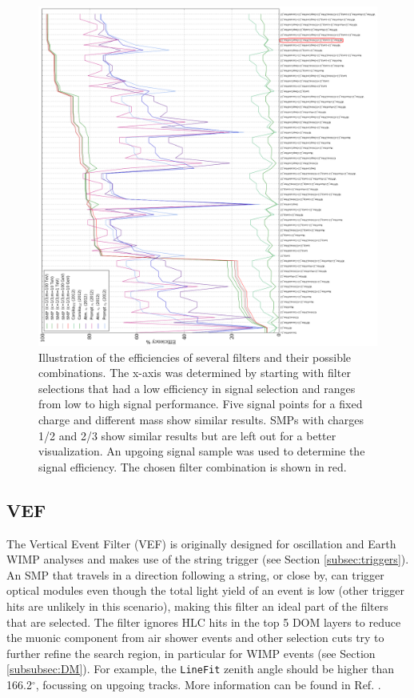 \begin{figure}
\centering
\includegraphics[width=\textwidth,height=0.85\textheight]{chapter8/img/FilterRate_better_rotated}
\caption{Illustration of the efficiencies of several filters and their possible combinations. The x-axis was determined by starting with filter selections that had a low efficiency in signal selection and ranges from low to high signal performance. Five signal points for a fixed charge and different mass show similar results. SMPs with charges 1/2 and 2/3 show similar results but are left out for a better visualization. An upgoing signal sample was used to determine the signal efficiency. The chosen filter combination is shown in red.}
\label{fig:filterrate}
\end{figure}

\subsection{VEF}
The Vertical Event Filter (VEF) is originally designed for oscillation and Earth WIMP analyses and makes use of the string trigger (see Section \ref{subsec:triggers}). An SMP that travels in a direction following a string, or close by, can trigger optical modules even though the total light yield of an event is low (other trigger hits are unlikely in this scenario), making this filter an ideal part of the filters that are selected. The filter ignores HLC hits in the top 5 DOM layers to reduce the muonic component from air shower events and other selection cuts try to further refine the search region, in particular for WIMP events (see Section \ref{subsubsec:DM}). For example, the \texttt{LineFit} zenith angle should be higher than 166.2$^\circ$, focussing on upgoing tracks. More information can be found in Ref. \cite{VEF2012}.

